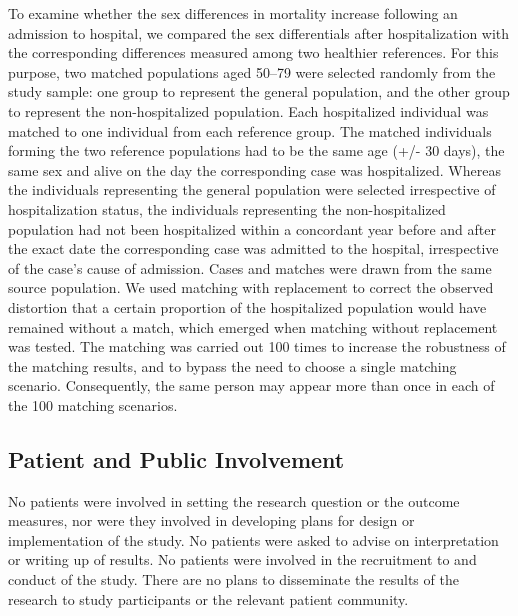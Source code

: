 To examine whether the sex differences in mortality increase following 
an admission to hospital, we compared the sex differentials after 
hospitalization with the corresponding differences measured among 
two healthier references. For this purpose, two matched populations 
aged 50--79 were selected randomly from the study sample: one group 
to represent the general population, and the other group to represent 
the non-hospitalized population. Each hospitalized individual was 
matched to one individual from each reference group. The matched 
individuals forming the two reference populations had to be the same 
age (+/- 30 days), the same sex and alive on the day the corresponding 
case was hospitalized. Whereas the individuals representing the 
general population were selected irrespective of hospitalization 
status, the individuals representing the non-hospitalized population 
had not been hospitalized within a concordant year before and after 
the exact date the corresponding case was admitted to the hospital, 
irrespective of the case's cause of admission. Cases and matches were 
drawn from the same source population. We used matching with replacement 
to correct the observed distortion that a certain proportion of the 
hospitalized population would have remained without a match, which 
emerged when matching without replacement was tested. The matching 
was carried out 100 times to increase the robustness of the matching 
results, and to bypass the need to choose a single matching scenario. 
Consequently, the same person may appear more than once in each of 
the 100 matching scenarios.\\

\subsection{Patient and Public Involvement}
No patients were involved in setting the research question or the 
outcome measures, nor were they involved in developing plans for 
design or implementation of the study. No patients were asked to 
advise on interpretation or writing up of results. No patients were 
involved in the recruitment to and conduct of the study. There are 
no plans to disseminate the results of the research to study 
participants or the relevant patient community.\\

